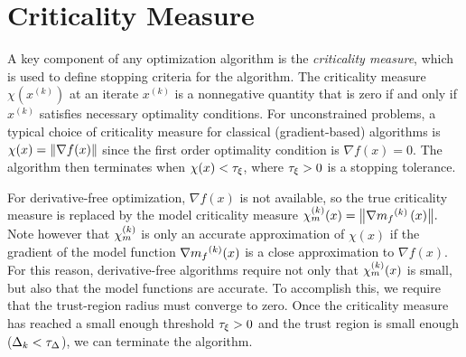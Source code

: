 \section{Criticality Measure}
\label{criticallity_measure_section}
A key component of any optimization algorithm is the {\em criticality measure}, which is used to define stopping criteria for the algorithm.
The criticality measure $\chi(x^{(k)})$ at an iterate $x^{(k)}$ is a nonnegative quantity that is zero if and only if $x^{(k)}$ satisfies necessary optimality conditions. 
For unconstrained problems,  a typical choice of criticality measure for classical (gradient-based) algorithms is $\chi(x) = {\left\|\nabla f(x)\right\|}$ 
since the first order optimality condition is $\nabla f(x)=0$.
The algorithm then terminates when $\chi(x) < \tau_{\xi}$, where $\tau_{\xi} >0$ is a stopping tolerance.

For derivative-free optimization,  $\nabla f(x)$ is not available,  so the true criticality measure is replaced by the model criticality measure 
${\chi_m^{(k)}}(x) = {\left\|\nabla {{m}_f}^{(k)}\left(x\right)\right\|}.$
Note however that ${\chi_m^{(k)}}$ is only an accurate approximation of $\chi(x)$ if the gradient of the model function $\nabla {{m}_f}^{(k)}(x)$ is a close approximation to $\nabla f(x)$.
For this reason, derivative-free algorithms require not only that ${\chi_m^{(k)}}(x)$ is small, but also that the model functions are accurate.
To accomplish this, we require that the trust-region radius must converge to zero.
Once the criticality measure has reached a small enough threshold $\tau_{\xi} > 0$ and the trust region is small enough ($\Delta_k < \tau_{\Delta}$), we can terminate the algorithm.



